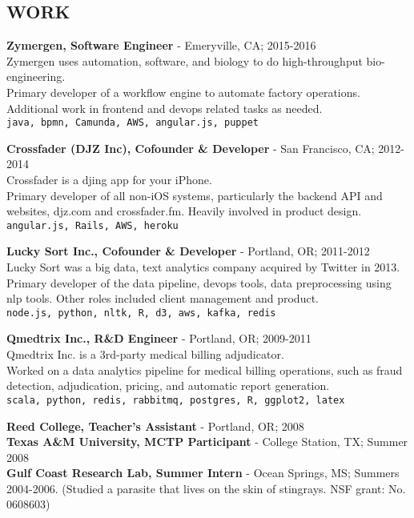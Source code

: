 \documentclass[11pt, line, margin]{res}
\newcommand{\prettysection}[1]{\setromanfont{TitilliumTitle20}\section{#1}\setromanfont{TitilliumText22L}}
\begin{document}

\begin{resume}

\prettysection{WORK}

{\bf Zymergen, Software Engineer} - Emeryville, CA;
2015-2016 \\
Zymergen uses automation, software, and
biology to do high-throughput bio-engineering. \\
Primary developer of a workflow engine to automate factory operations.
Additional work in frontend and devops related tasks as needed. \\
\texttt{java, bpmn, Camunda, AWS, angular.js, puppet}

{\bf Crossfader (DJZ Inc), Cofounder \& Developer} - San Francisco,
CA; 2012-2014 \\
Crossfader is a djing app for your iPhone. \\
Primary developer of all non-iOS systems, particularly the backend
API and websites, djz.com and crossfader.fm. Heavily involved in
product design. \\
\texttt{angular.js, Rails, AWS, heroku}

{\bf Lucky Sort Inc., Cofounder \& Developer} - Portland, OR;
2011-2012 \\
Lucky Sort was a big data, text analytics company acquired by
Twitter in 2013. \\
Primary developer of the data pipeline,
devops tools, data preprocessing using nlp tools.  Other roles
included client management and product. \\
\texttt{node.js, python, nltk, R, d3, aws, kafka, redis}

{\bf Qmedtrix Inc., R\&D Engineer} - Portland, OR; 2009-2011 \\
Qmedtrix Inc. is a 3rd-party medical billing adjudicator. \\
Worked on a data analytics pipeline for medical billing operations, such as fraud detection, adjudication,
pricing, and automatic report generation. \\
\texttt{scala, python, redis, rabbitmq, postgres, R, ggplot2, latex}

{\bf Reed College, Teacher's Assistant} - Portland, OR;
2008 \\
{\bf Texas A\&M University, MCTP Participant} - College Station,
  TX; Summer 2008 \\
{\bf Gulf Coast Research Lab, Summer Intern} - Ocean Springs, MS;
  Summers 2004-2006. (Studied a parasite that lives on the skin of stingrays. NSF grant: No. 0608603)


\end{resume}
\end{document}

